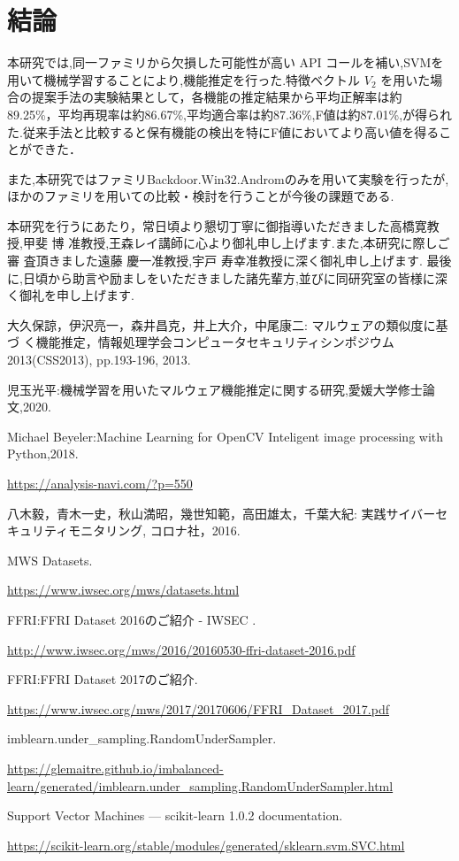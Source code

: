 \documentclass{thesis}
\begin{document}
\chapter{結論}
本研究では,同一ファミリから欠損した可能性が高い API コールを補い,SVMを用いて機械学習することにより,機能推定を行った.特徴ベクトル $V_2$ を用いた場合の提案手法の実験結果として，各機能の推定結果から平均正解率は約89.25\%，平均再現率は約86.67\%,平均適合率は約87.36\%,F値は約87.01\%,が得られた.従来手法と比較すると保有機能の検出を特にF値においてより高い値を得ることができた．


また,本研究ではファミリBackdoor.Win32.Andromのみを用いて実験を行ったが,ほかのファミリを用いての比較・検討を行うことが今後の課題である.

\acknowledgement
本研究を行うにあたり，常日頃より懇切丁寧に御指導いただきました高橋寛教授,甲斐 博 准教授,王森レイ講師に心より御礼申し上げます.また,本研究に際しご審
査頂きました遠藤 慶一准教授,宇戸 寿幸准教授に深く御礼申し上げます.
 最後に,日頃から助言や励ましをいただきました諸先輩方,並びに同研究室の皆様に深く御礼を申し上げます.

\begin{thebibliography}{99}


大久保諒，伊沢亮一，森井昌克，井上大介，中尾康二: マルウェアの類似度に基づ
く機能推定，情報処理学会コンピュータセキュリティシンポジウム 2013(CSS2013),
pp.193-196, 2013.

児玉光平:機械学習を用いたマルウェア機能推定に関する研究,愛媛大学修士論文,2020.

Michael Beyeler:Machine Learning for OpenCV Inteligent image processing with Python,2018.


\url{https://analysis-navi.com/?p=550}

八木毅，青木一史，秋山満昭，幾世知範，高田雄太，千葉大紀: 実践サイバーセキュリティモニタリング, コロナ社，2016.

MWS Datasets.

\url{https://www.iwsec.org/mws/datasets.html}


FFRI:FFRI Dataset 2016のご紹介 - IWSEC .

\url{http://www.iwsec.org/mws/2016/20160530-ffri-dataset-2016.pdf}

FFRI:FFRI Dataset 2017のご紹介.

\url{https://www.iwsec.org/mws/2017/20170606/FFRI_Dataset_2017.pdf}

imblearn.under\_sampling.RandomUnderSampler.

\url{https://glemaitre.github.io/imbalanced-learn/generated/imblearn.under_sampling.RandomUnderSampler.html}

Support Vector Machines — scikit-learn 1.0.2 documentation.

\url{https://scikit-learn.org/stable/modules/generated/sklearn.svm.SVC.html}
\end{thebibliography}
\end{document}
